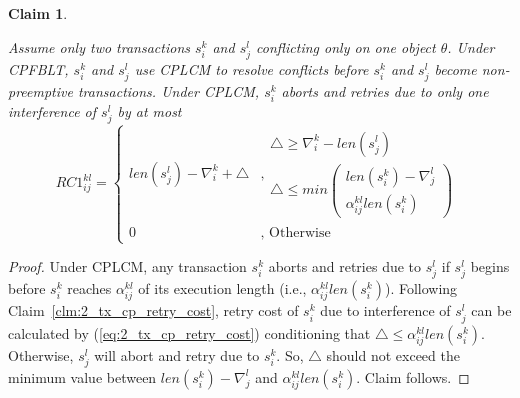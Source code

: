\documentclass[preprint]{sigplanconf}
\newtheorem{clm}{Claim}
\begin{document}
\begin{clm}\label{clm:cplcm_before_alpha_two_tx}

Assume only two transactions $s_i^k$ and $s_j^l$ conflicting only on one object $\theta$. Under CPFBLT, $s_{i}^{k}$ and $s_j^l$ use CPLCM to resolve conflicts before $s_{i}^{k}$ and $s_j^l$ become non-preemptive transactions. Under CPLCM, $s_{i}^{k}$ aborts and retries due to only one interference of $s_{j}^{l}$ by at most 
%
\begin{equation}
RC1_{ij}^{kl}=\begin{cases}
len\left(s_{j}^{l}\right)-\nabla_{i}^{k}+\triangle & \mbox{,}\begin{gathered}\triangle\ge\nabla_{i}^{k}-len\left(s_{j}^{l}\right)\\
\triangle\le min\left(\begin{gathered}len\left(s_{i}^{k}\right)-\nabla_{j}^{l}\\
\alpha_{ij}^{kl}len\left(s_{i}^{k}\right)
\end{gathered}
\right)
\end{gathered}
\\
0 & \mbox{, Otherwise}
\end{cases}\label{eq:cplcm_before_alpha_two_tx}
\end{equation}
%
\end{clm}
%
\begin{proof}
%
Under CPLCM, any transaction $s_{i}^{k}$ aborts and retries due to $s_{j}^{l}$ if $s_{j}^{l}$
begins before $s_{i}^{k}$ reaches $\alpha_{ij}^{kl}$ of its execution length (i.e., $\alpha_{ij}^{kl}len(s_{i}^{k})$). Following Claim~\ref{clm:2_tx_cp_retry_cost}, retry cost of $s_{i}^{k}$ due to interference of $s_{j}^{l}$ can be calculated by (\ref{eq:2_tx_cp_retry_cost}) conditioning that $\triangle\le\alpha_{ij}^{kl}len\left(s_{i}^{k}\right)$. Otherwise, $s_j^l$ will abort and retry due to $s_i^k$. So, $\triangle$ should not exceed the minimum value between $len\left(s_{i}^{k}\right)-\nabla_{j}^{l}$ and $\alpha_{ij}^{kl}len\left(s_{i}^{k}\right)$. Claim follows.
%
\end{proof}
%
\end{document}
